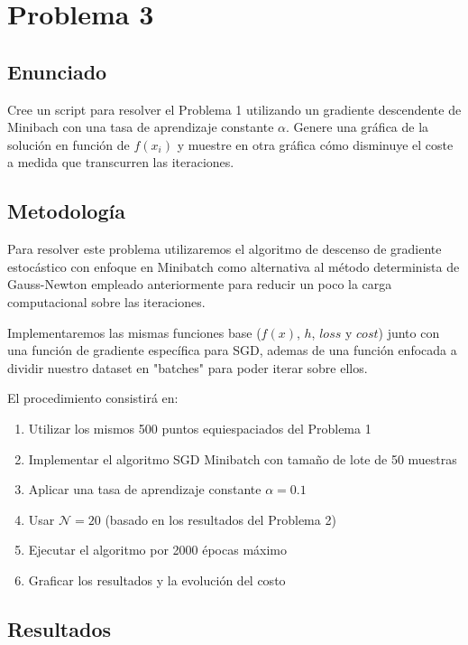 \documentclass{article}
\begin{document}
\section{Problema 3}

\subsection{Enunciado}

Cree un script para resolver el Problema 1 utilizando un gradiente descendente de Minibach con una tasa de aprendizaje constante $\alpha$. Genere una gráfica de la solución en función de $f(x_i)$ y muestre en otra gráfica cómo disminuye el coste a medida que transcurren las iteraciones.

\subsection{Metodología}

Para resolver este problema utilizaremos el algoritmo de descenso de gradiente estocástico con enfoque en Minibatch como alternativa al método determinista de Gauss-Newton empleado anteriormente para reducir un poco la carga computacional sobre las iteraciones.

Implementaremos las mismas funciones base ($f(x)$, $h$, $loss$ y $cost$) junto con una función de gradiente específica para SGD, ademas de una función enfocada a dividir nuestro dataset en "batches" para poder iterar sobre ellos.

El procedimiento consistirá en:
\begin{enumerate}
    \item Utilizar los mismos 500 puntos equiespaciados del Problema 1
    \item Implementar el algoritmo SGD Minibatch con tamaño de lote de 50 muestras
    \item Aplicar una tasa de aprendizaje constante $\alpha = 0.1$
    \item Usar $\mathcal{N} = 20$ (basado en los resultados del Problema 2)
    \item Ejecutar el algoritmo por 2000 épocas máximo
    \item Graficar los resultados y la evolución del costo
\end{enumerate}

\subsection{Resultados}
\setcounter{equation}{0}
\end{document}
